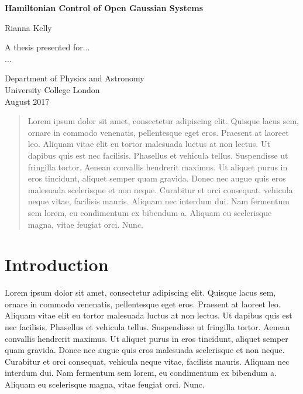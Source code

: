 \documentclass[11pt,a4paper]{article}
\numberwithin{equation}{section}
\begin{document}
	\begin{titlepage}
		\begin{center}
			\vspace*{1cm}
			
			\textbf{\LARGE{Hamiltonian Control of Open Gaussian Systems}}
			
			\vspace{0.5cm}
			
			\large{Rianna Kelly}
			
			\vfill
			
			A thesis presented for...\\
			...
			
			\vspace{0.8cm}
			
			Department of Physics and Astronomy\\
			University College London\\
			August 2017
			
			\vspace{0.5\textheight}
			
		\end{center}
	\end{titlepage}

	\color{red}\begin{abstract}
	Lorem ipsum dolor sit amet, consectetur adipiscing elit. Quisque lacus sem, ornare in commodo venenatis, pellentesque eget eros. Praesent at laoreet leo. Aliquam vitae elit eu tortor malesuada luctus at non lectus. Ut dapibus quis est nec facilisis. Phasellus et vehicula tellus. Suspendisse ut fringilla tortor. Aenean convallis hendrerit maximus. Ut aliquet purus in eros tincidunt, aliquet semper quam gravida. Donec nec augue quis eros malesuada scelerisque et non neque. Curabitur et orci consequat, vehicula neque vitae, facilisis mauris. Aliquam nec interdum dui. Nam fermentum sem lorem, eu condimentum ex bibendum a. Aliquam eu scelerisque magna, vitae feugiat orci. Nunc.
	\end{abstract}\color{black}
	
	\tableofcontents
	\listoffigures

	\newpage
		
	\color{red}\section{Introduction}
	Lorem ipsum dolor sit amet, consectetur adipiscing elit. Quisque lacus sem, ornare in commodo venenatis, pellentesque eget eros. Praesent at laoreet leo. Aliquam vitae elit eu tortor malesuada luctus at non lectus. Ut dapibus quis est nec facilisis. Phasellus et vehicula tellus. Suspendisse ut fringilla tortor. Aenean convallis hendrerit maximus. Ut aliquet purus in eros tincidunt, aliquet semper quam gravida. Donec nec augue quis eros malesuada scelerisque et non neque. Curabitur et orci consequat, vehicula neque vitae, facilisis mauris. Aliquam nec interdum dui. Nam fermentum sem lorem, eu condimentum ex bibendum a. Aliquam eu scelerisque magna, vitae feugiat orci. Nunc.
	
\end{document}

